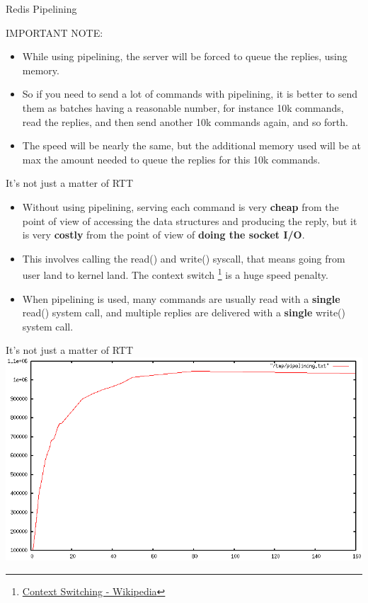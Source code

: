 \documentclass[10pt]{beamer}
\begin{document}
\begin{frame}[fragile]{Redis Pipelining}
  \begin{alertblock}{IMPORTANT NOTE:}
    \begin{itemize}
      \item While using pipelining, the server will be forced to queue the
      replies, using memory.
      \item So if you need to send a lot of commands with pipelining, it is
      better to send them as batches having a reasonable number, for instance
      10k commands, read the replies, and then send another 10k commands again,
      and so forth.
      \item The speed will be nearly the same, but the additional memory used
      will be at max the amount needed to queue the replies for this 10k commands.
    \end{itemize}
	\end{alertblock}
\end{frame}

\begin{frame}[fragile]{It's not just a matter of RTT}
  \begin{itemize}
    \item Without using pipelining, serving each command is very \textbf{cheap}
    from the point of view of accessing the data structures and producing the
    reply, but it is very \textbf{costly} from the point of view of
    \textbf{doing the socket I/O}.
    \item This involves calling the read() and write() syscall, that means going
    from user land to kernel land. The context switch
    \footnote{\href{https://en.0wikipedia.org/index.php?q=aHR0cHM6Ly9lbi53aWtpcGVkaWEub3JnL3dpa2kvQ29udGV4dF9zd2l0Y2g}{Context Switching - Wikipedia}}
    is a huge speed penalty.
    \item When pipelining is used, many commands are usually read with a
    \textbf{single} read() system call, and multiple replies are delivered with
    a \textbf{single} write() system call.
  \end{itemize}

\end{frame}

\begin{frame}[fragile]{It's not just a matter of RTT}
  \includegraphics[scale=0.4]{img/pipeline_iops}
\end{frame}
\end{document}
